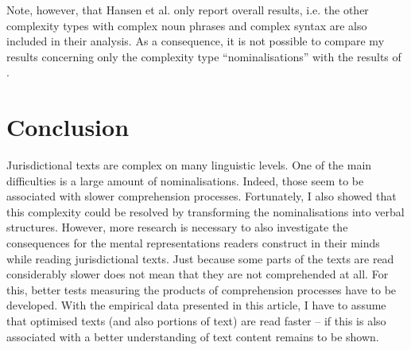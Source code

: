 \documentclass[output=paper]{langsci/langscibook}
\begin{document}
Note, however, that Hansen et al. only report overall results, i.e. the other complexity types with complex noun phrases and complex syntax are also included in their analysis. As a consequence, it is not possible to compare my results concerning only the complexity type ``nominalisations'' with the results of \citet{Hansen2006}. 

\section{Conclusion}

Jurisdictional texts are complex on many linguistic levels. One of the main difficulties is a large amount of nominalisations. Indeed, those seem to be associated with slower comprehension processes. Fortunately, I also showed that this complexity could be resolved by transforming the nominalisations into verbal structures. However, more research is necessary to also investigate the consequences for the mental representations readers construct in their minds while reading jurisdictional texts. Just because some parts of the texts are read considerably slower does not mean that they are not comprehended at all. For this, better tests measuring the products of comprehension processes have to be developed. With the empirical data presented in this article, I have to assume that optimised texts (and also portions of text) are read faster -- if this is also associated with a better understanding of text content remains to be shown.
\end{document}

